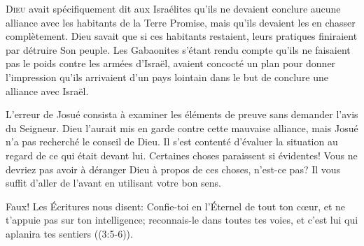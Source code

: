



\lettrine{D}{ieu} avait spécifiquement dit aux Israélites
 qu'ils ne devaient conclure aucune alliance avec les habitants
 de la Terre Promise, mais qu'ils devaient les en chasser complètement.
 Dieu savait que si ces habitants restaient, leurs pratiques finiraient
 par détruire Son peuple.
 Les Gabaonites s'étant rendu compte qu'ils ne faisaient
 pas le poids contre les armées d'Israël,
 avaient concocté un plan pour donner l'impression
 qu'ils arrivaient d'un pays lointain
 dans le but de conclure une alliance avec Israël.

L'erreur de Josué consista à examiner les éléments de preuve
 sans demander l'avis du Seigneur.
 Dieu l'aurait mis en garde contre cette mauvaise alliance,
 mais Josué n'a pas recherché le conseil de Dieu.
 Il s'est contenté d'évaluer la situation au regard de ce qui était devant lui.
 Certaines choses paraissent si évidentes!
 Vous ne devriez pas avoir à déranger Dieu à propos de ces choses,
 n'est-ce pas?
 Il vous suffit \Og d'aller de l'avant en utilisant votre bon sens. \Fg{}

Faux! Les Écritures nous disent:
 \Og Confie-toi en l'Éternel de tout ton c\oe{}ur,
 et ne t'appuie pas sur ton intelligence;
 reconnais-le dans toutes tes voies,
 et c'est lui qui aplanira tes sentiers \Fg{} ((3:5-6)).


